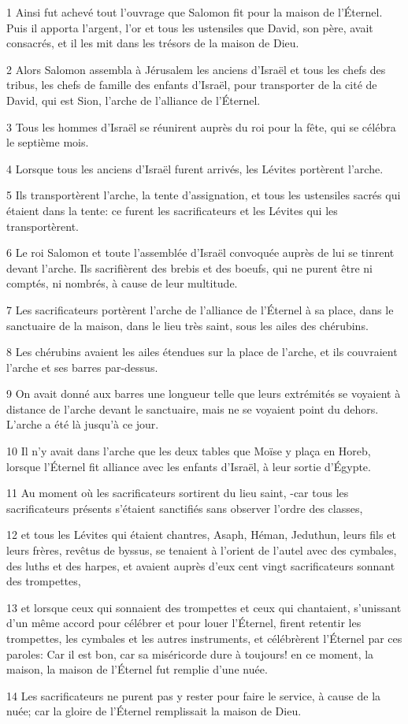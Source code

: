 \par 1 Ainsi fut achevé tout l'ouvrage que Salomon fit pour la maison de l'Éternel. Puis il apporta l'argent, l'or et tous les ustensiles que David, son père, avait consacrés, et il les mit dans les trésors de la maison de Dieu.
\par 2 Alors Salomon assembla à Jérusalem les anciens d'Israël et tous les chefs des tribus, les chefs de famille des enfants d'Israël, pour transporter de la cité de David, qui est Sion, l'arche de l'alliance de l'Éternel.
\par 3 Tous les hommes d'Israël se réunirent auprès du roi pour la fête, qui se célébra le septième mois.
\par 4 Lorsque tous les anciens d'Israël furent arrivés, les Lévites portèrent l'arche.
\par 5 Ils transportèrent l'arche, la tente d'assignation, et tous les ustensiles sacrés qui étaient dans la tente: ce furent les sacrificateurs et les Lévites qui les transportèrent.
\par 6 Le roi Salomon et toute l'assemblée d'Israël convoquée auprès de lui se tinrent devant l'arche. Ils sacrifièrent des brebis et des boeufs, qui ne purent être ni comptés, ni nombrés, à cause de leur multitude.
\par 7 Les sacrificateurs portèrent l'arche de l'alliance de l'Éternel à sa place, dans le sanctuaire de la maison, dans le lieu très saint, sous les ailes des chérubins.
\par 8 Les chérubins avaient les ailes étendues sur la place de l'arche, et ils couvraient l'arche et ses barres par-dessus.
\par 9 On avait donné aux barres une longueur telle que leurs extrémités se voyaient à distance de l'arche devant le sanctuaire, mais ne se voyaient point du dehors. L'arche a été là jusqu'à ce jour.
\par 10 Il n'y avait dans l'arche que les deux tables que Moïse y plaça en Horeb, lorsque l'Éternel fit alliance avec les enfants d'Israël, à leur sortie d'Égypte.
\par 11 Au moment où les sacrificateurs sortirent du lieu saint, -car tous les sacrificateurs présents s'étaient sanctifiés sans observer l'ordre des classes,
\par 12 et tous les Lévites qui étaient chantres, Asaph, Héman, Jeduthun, leurs fils et leurs frères, revêtus de byssus, se tenaient à l'orient de l'autel avec des cymbales, des luths et des harpes, et avaient auprès d'eux cent vingt sacrificateurs sonnant des trompettes,
\par 13 et lorsque ceux qui sonnaient des trompettes et ceux qui chantaient, s'unissant d'un même accord pour célébrer et pour louer l'Éternel, firent retentir les trompettes, les cymbales et les autres instruments, et célébrèrent l'Éternel par ces paroles: Car il est bon, car sa miséricorde dure à toujours! en ce moment, la maison, la maison de l'Éternel fut remplie d'une nuée.
\par 14 Les sacrificateurs ne purent pas y rester pour faire le service, à cause de la nuée; car la gloire de l'Éternel remplissait la maison de Dieu.

